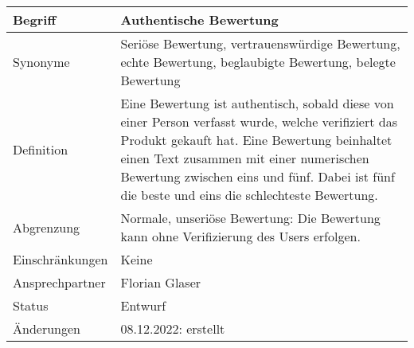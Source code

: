 \begin{table}[H]
    \centering
    \label{gls:authentischeBewertung}
    \begin{tabularx}{\textwidth}{| l | X |}
        \hline
        Begriff         & Authentische Bewertung                                                                                                                                                                                                                                                                          \\
        \hline
        Synonyme        & Seriöse Bewertung, vertrauenswürdige Bewertung, echte Bewertung, beglaubigte Bewertung, belegte Bewertung                                                                                                                                                                                       \\
        \hline
        Definition      & Eine Bewertung ist authentisch, sobald diese von einer Person verfasst wurde, welche verifiziert das Produkt gekauft hat. Eine Bewertung beinhaltet einen Text zusammen mit einer numerischen Bewertung zwischen eins und fünf. Dabei ist fünf die beste und eins die schlechteste Bewertung. \\
        \hline
        Abgrenzung      & Normale, unseriöse Bewertung: Die Bewertung kann ohne Verifizierung des Users erfolgen.                                                                                                                                                                                                         \\
        \hline
        Einschränkungen & Keine                                                                                                                                                                                                                                                                                           \\
        \hline
        Ansprechpartner & Florian Glaser                                                                                                                                                                                                                                                                                  \\
        \hline
        Status          & Entwurf                                                                                                                                                                                                                                                                                         \\
        \hline
        Änderungen      & 08.12.2022: erstellt                                                                                                                                                                                                                                                                            \\
        \hline
    \end{tabularx}
\end{table}

